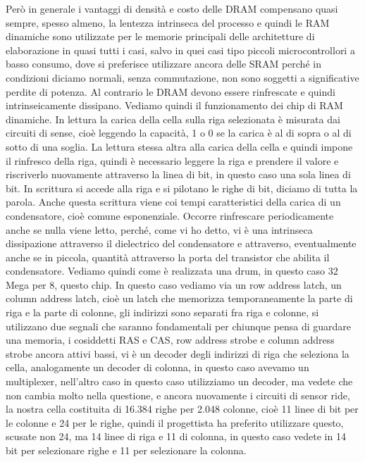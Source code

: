 Però in generale i vantaggi di densità e costo delle DRAM compensano quasi sempre, spesso almeno, la lentezza intrinseca del processo e quindi le RAM dinamiche sono utilizzate per le memorie principali delle architetture di elaborazione in quasi tutti i casi, salvo in quei casi tipo piccoli microcontrollori a basso consumo, dove si preferisce utilizzare ancora delle SRAM perché in condizioni diciamo normali, senza commutazione, non sono soggetti a significative perdite di potenza. Al contrario le DRAM devono essere rinfrescate e quindi intrinseicamente dissipano.
Vediamo quindi il funzionamento dei chip di RAM dinamiche.
In lettura la carica della cella sulla riga selezionata è misurata dai circuiti di sense, cioè leggendo la capacità, 1 o 0 se la carica è al di sopra o al di sotto di una soglia.
La lettura stessa altra alla carica della cella e quindi impone il rinfresco della riga, quindi è necessario leggere la riga e prendere il valore e riscriverlo nuovamente attraverso la linea di bit, in questo caso una sola linea di bit.
In scrittura si accede alla riga e si pilotano le righe di bit, diciamo di tutta la parola.
Anche questa scrittura viene coi tempi caratteristici della carica di un condensatore, cioè comune esponenziale.
Occorre rinfrescare periodicamente anche se nulla viene letto, perché, come vi ho detto, vi è una intrinseca dissipazione attraverso il dielectrico del condensatore e attraverso, eventualmente anche se in piccola, quantità attraverso la porta del transistor che abilita il condensatore.
Vediamo quindi come è realizzata una drum, in questo caso 32 Mega per 8, questo chip.
In questo caso vediamo via un row address latch, un column address latch, cioè un latch che memorizza temporaneamente la parte di riga e la parte di colonne, gli indirizzi sono separati fra riga e colonne, si utilizzano due segnali che saranno fondamentali per chiunque pensa di guardare una memoria, i cosiddetti RAS e CAS, row address strobe e column address strobe ancora attivi bassi, vi è un decoder degli indirizzi di riga che seleziona la cella, analogamente un decoder di colonna, in questo caso avevamo un multiplexer, nell'altro caso in questo caso utilizziamo un decoder, ma vedete che non cambia molto nella questione, e ancora nuovamente i circuiti di sensor ride, la nostra cella costituita di 16.384 righe per 2.048 colonne, cioè 11 linee di bit per le colonne e 24 per le righe, quindi il progettista ha preferito utilizzare questo, scusate non 24, ma 14 linee di riga e 11 di colonna, in questo caso vedete in 14 bit per selezionare righe e 11 per selezionare la colonna.
